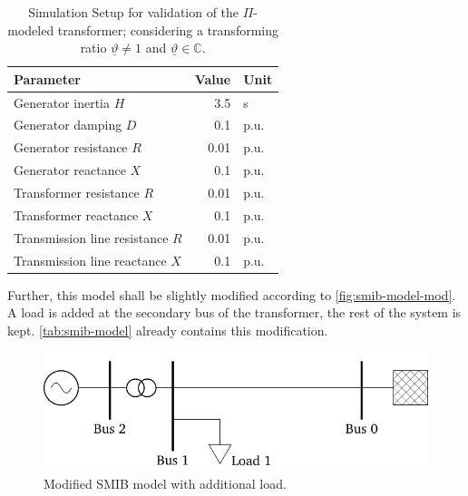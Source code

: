 \begin{table}[htb]
    \caption[Simulation Setup for validation of the $\Pi$-modeled transformer]{Simulation Setup for validation of the $\Pi$-modeled transformer; considering a transforming ratio $\underline{\vartheta} \neq 1$ and $\underline{\vartheta} \in \mathbb{C}$.}
    \label{tab:smib-model}
    \vspace*{12pt}
    \centering
    \small
    \begin{tabularx}{\textwidth}{Xrl}
        \textbf{Parameter} & \textbf{Value} & \textbf{Unit} \\ \hline
        \toprule
        Generator inertia $H$ & 3.5 & s \\
        Generator damping $D$ & 0.1 & p.u. \\
        Generator resistance $R$ & 0.01 & p.u. \\
        Generator reactance $X$ & 0.1 & p.u. \\
        Transformer resistance $R$ & 0.01 & p.u. \\
        Transformer reactance $X$ & 0.1 & p.u. \\
        Transmission line resistance $R$ & 0.01 & p.u. \\
        Transmission line reactance $X$ & 0.1 & p.u. \\
        \bottomrule
    \end{tabularx}
\end{table}

Further, this model shall be slightly modified according to \autoref{fig:smib-model-mod}. 
A load is added at the secondary bus of the transformer, the rest of the system is kept. \autoref{tab:smib-model} already contains this modification.

\begin{figure}[htb!]
    \centering
    \vspace{12pt}
    \includegraphics{tikz_graphics/images/smib_model_with_load.pdf}
    \vspace{12pt}
    \caption[Modified \acf{SMIB} model with additional load]{Modified \acf{SMIB} model with additional load.}
    \label{fig:smib-model-mod}
\end{figure}

